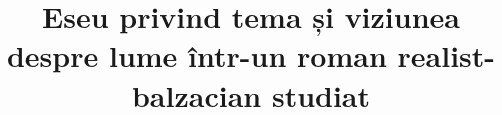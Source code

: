 

\title{Eseu privind tema și viziunea despre lume într-un roman realist-balzacian studiat}


 \maketitle %
 

